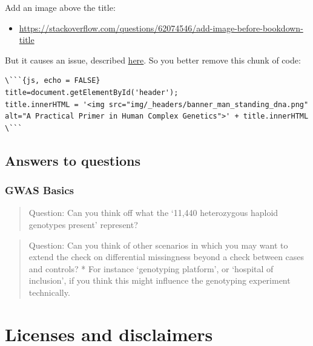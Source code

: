 \documentclass[
]{book}
\providecommand{\tightlist}{%
  \setlength{\itemsep}{0pt}\setlength{\parskip}{0pt}}
\begin{document}
Add an image above the title:

\begin{itemize}
\tightlist
\item
  \url{https://stackoverflow.com/questions/62074546/add-image-before-bookdown-title}
\end{itemize}

But it causes an issue, described \href{https://www.mobileread.com/forums/showthread.php?t=206086}{here}. So you better remove this chunk of code:

\begin{lstlisting}
\```{js, echo = FALSE}
title=document.getElementById('header');
title.innerHTML = '<img src="img/_headers/banner_man_standing_dna.png" alt="A Practical Primer in Human Complex Genetics">' + title.innerHTML
\```
\end{lstlisting}

\hypertarget{answers-to-questions}{%
\section{Answers to questions}\label{answers-to-questions}}

\hypertarget{gwas-basics-1}{%
\subsection{GWAS Basics}\label{gwas-basics-1}}

\begin{quote}
Question: Can you think off what the `11,440 heterozygous haploid genotypes present' represent?
\end{quote}

\begin{quote}
Question: Can you think of other scenarios in which you may want to extend the check on differential missingness beyond a check between cases and controls?
* For instance `genotyping platform', or `hospital of inclusion', if you think this might influence the genotyping experiment technically.
\end{quote}

\hypertarget{license}{%
\chapter{Licenses and disclaimers}\label{license}}
\end{document}
